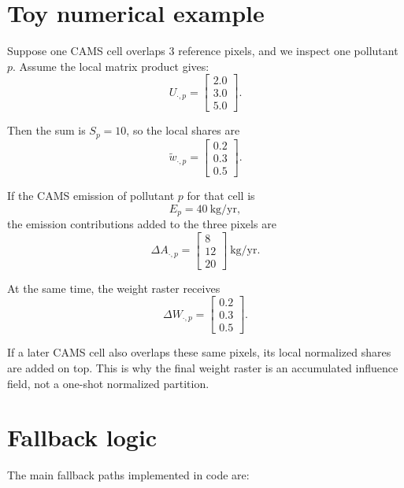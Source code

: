 \documentclass[11pt,a4paper]{article}
\begin{document}
\section{Toy numerical example}

Suppose one CAMS cell overlaps 3 reference pixels, and we inspect one pollutant $p$.
Assume the local matrix product gives:
\[
U_{\cdot,p} = \begin{bmatrix} 2.0 \\ 3.0 \\ 5.0 \end{bmatrix}.
\]

Then the sum is $S_p = 10$, so the local shares are
\[
\widetilde{w}_{\cdot,p} =
\begin{bmatrix}
0.2 \\ 0.3 \\ 0.5
\end{bmatrix}.
\]

If the CAMS emission of pollutant $p$ for that cell is
\[
E_p = 40\ \mathrm{kg/yr},
\]
the emission contributions added to the three pixels are
\[
\Delta A_{\cdot,p} =
\begin{bmatrix}
8 \\ 12 \\ 20
\end{bmatrix}\ \mathrm{kg/yr}.
\]

At the same time, the weight raster receives
\[
\Delta W_{\cdot,p} =
\begin{bmatrix}
0.2 \\ 0.3 \\ 0.5
\end{bmatrix}.
\]

If a later CAMS cell also overlaps these same pixels, its local normalized shares are
added on top. This is why the final weight raster is an accumulated influence field,
not a one-shot normalized partition.

\section{Fallback logic}

The main fallback paths implemented in code are:
\end{document}
